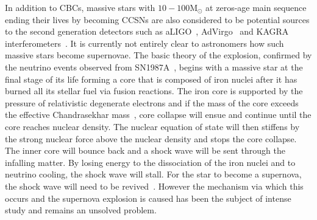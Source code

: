 \documentclass[aps,twocolumn,showpacs,groupedaddress, nofootinbib]{revtex4}  %
\begin{document}
%
%
In addition to \acp{CBC}, massive stars with $10-100 \text{M}_\odot $ at
zeros-age main sequence ending their lives by becoming 
\acp{CCSN} are also considered to be potential sources to the second generation
detectors such as \ac{aLIGO}~\cite{aasi2015advanced},
\ac{AdVirgo}~\cite{acernese2014advanced} and KAGRA
interferometers~\cite{aso2013interferometer, gossan2016observing,
abbott2016first}. It is currently not entirely clear to astronomers how such
massive stars become supernovae. The basic theory of the explosion, confirmed
by the neutrino events observed from SN1987A~\cite{sato1987analysis}, begins
with a massive star at the final stage of its life forming a core that is
composed of iron nuclei after it has burned all its stellar fuel via fusion
reactions. The iron core is supported by the pressure of relativistic
degenerate electrons and if the mass of the core exceeds the effective
Chandrasekhar mass~\cite{baron1990effect, bethe1990supernova}, core collapse
will ensue and continue until the core reaches nuclear density. The nuclear
equation of state will then stiffens by the strong nuclear force above the
nuclear density and stops the core collapse. The inner core will bounce back
and a shock wave will be sent through the infalling matter.  By losing energy
to the dissociation of the iron nuclei and to neutrino cooling, the shock wave
will stall. For the star to become a supernova, the shock wave will need to be
revived~\cite{o2011black}. However the mechanism via which this occurs and the
supernova explosion is caused has been the subject of intense study and remains
an unsolved problem.
\end{document}
